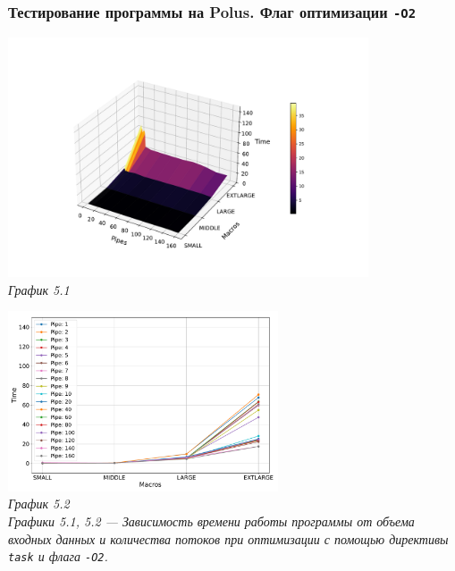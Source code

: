 \documentclass[a4paper, 11pt]{article}
\begin{document}
\subsubsection*{Тестирование программы на Polus. Флаг оптимизации \texttt{-O2}}
\begin{center}
    \includegraphics[width=0.8\textwidth]{../graph/task_o2.pdf} \\
    \small \it
    График 5.1
\end{center}

\begin{center}
    \includegraphics[width=0.6\textwidth]{../graph/task_o21.pdf} \\
    \small \it
    График 5.2\\ Графики 5.1, 5.2 --- Зависимость времени работы программы от объема входных данных и количества потоков при оптимизации с помощью директивы \texttt{task} и флага \texttt{-O2}.
\end{center}
\end{document}

